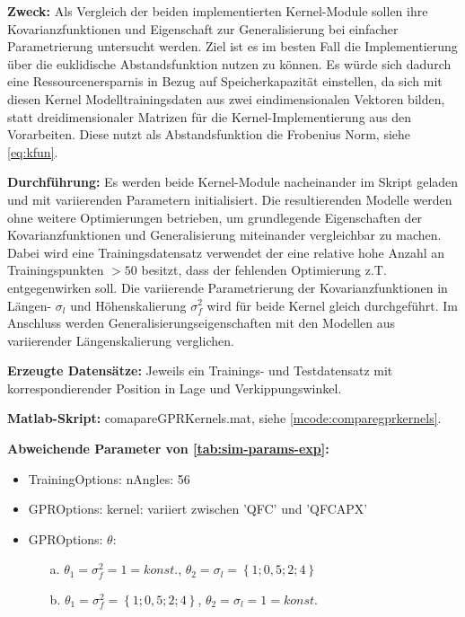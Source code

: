 \textbf{Zweck:} Als Vergleich der beiden implementierten Kernel-Module sollen ihre Kovarianzfunktionen und Eigenschaft zur Generalisierung bei einfacher Parametrierung untersucht werden. Ziel ist es im besten Fall die Implementierung über die euklidische Abstandsfunktion nutzen zu können. Es würde sich dadurch eine Ressourcenersparnis in Bezug auf Speicherkapazität einstellen, da sich mit diesen Kernel Modelltrainingsdaten aus zwei eindimensionalen Vektoren bilden, statt dreidimensionaler Matrizen für die Kernel-Implementierung aus den Vorarbeiten. Diese nutzt als Abstandsfunktion die Frobenius Norm, siehe \autoref{eq:kfun}.


\clearpage


\textbf{Durchführung:} Es werden beide Kernel-Module nacheinander im Skript geladen und mit variierenden Parametern initialisiert. Die resultierenden Modelle werden ohne weitere Optimierungen betrieben, um grundlegende Eigenschaften der Kovarianzfunktionen und Generalisierung miteinander vergleichbar zu machen. Dabei wird eine Trainingsdatensatz verwendet der eine relative hohe Anzahl an Trainingspunkten $>50$ besitzt, dass der fehlenden Optimierung z.T. entgegenwirken soll. Die variierende Parametrierung der Kovarianzfunktionen in Längen- $\sigma_l$ und Höhenskalierung $\sigma_f^2$ wird für beide Kernel gleich durchgeführt. Im Anschluss werden Generalisierungseigenschaften mit den Modellen aus variierender Längenskalierung verglichen.

\textbf{Erzeugte Datensätze:} Jeweils ein Trainings- und Testdatensatz mit korrespondierender Position in Lage und Verkippungswinkel.

\textbf{Matlab-Skript:} comapareGPRKernels.mat, siehe \autoref{mcode:comparegprkernels}.

\textbf{Abweichende Parameter von \autoref{tab:sim-params-exp}:}

\begin{itemize}
	\item TrainingOptions: nAngles: 56
	\item GPROptions: kernel: variiert zwischen 'QFC' und 'QFCAPX'
	\item GPROptions: $\theta$:
	\begin{itemize}
		\item[a.] $\theta_1 =\sigma_f^2 = 1 = konst.$, $\theta_2 = \sigma_l = \left\{ 1; 0,5; 2; 4 \right\}$
		\item[b.] $\theta_1 =\sigma_f^2 = \left\{ 1; 0,5; 2; 4 \right\}$, $\theta_2 = \sigma_l = 1 = konst.$
	\end{itemize}
\end{itemize}




